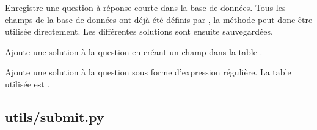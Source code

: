 \documentclass[a4,10pt,french]{sphinxmanual}
\begin{document}
\begin{fulllineitems}
\label{source:quiz.utils.save.SaveSimpleQuestion}
Enregistre une question à réponse courte dans la base de données. Tous les champs
de la base de données ont déjà été définis par {\hyperref[source:quiz.utils.save.SaveQuestion]{\emph{}}},
la méthode  peut donc être utilisée directement. Les différentes
solutions sont ensuite sauvegardées.

\begin{fulllineitems}
\label{source:quiz.utils.save.SaveSimpleQuestion.add_answer}
Ajoute une solution à la question en créant un champ dans la table 
.

\end{fulllineitems}


\begin{fulllineitems}
\label{source:quiz.utils.save.SaveSimpleQuestion.add_regex_answer}
Ajoute une solution à la question sous forme d'expression régulière. La
table utilisée est .

\end{fulllineitems}


\end{fulllineitems}



\subsection{utils/submit.py}
\label{source:module-quiz.utils.submit}\label{source:utils-submit-py}
\end{document}
